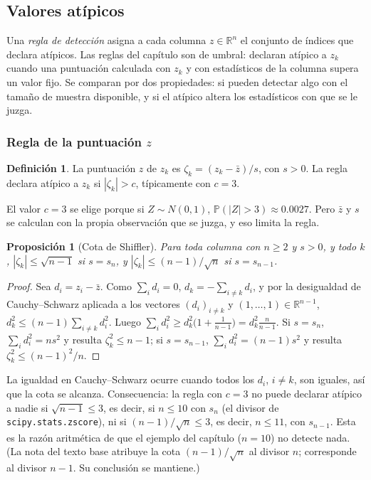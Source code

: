 \documentclass[11pt,a4paper]{article}
\theoremstyle{plain}
\newtheorem{proposicion}[teorema]{Proposición}
\theoremstyle{definition}
\newtheorem{definicion}[teorema]{Definición}
\theoremstyle{remark}
\newcommand{\R}{\mathbb{R}}
\newcommand{\Prob}{\mathbb{P}}
\newcommand{\1}{\mathbf{1}}
\begin{document}
\subsection{Valores atípicos}\label{sec:atipicos}

Una \emph{regla de detección} asigna a cada columna $z\in\R^n$ el
conjunto de índices que declara atípicos. Las reglas del capítulo son de
umbral: declaran atípico a $z_k$ cuando una puntuación calculada con $z_k$
y con estadísticos de la columna supera un valor fijo. Se comparan por dos
propiedades: si pueden detectar algo con el tamaño de muestra disponible, y
si el atípico altera los estadísticos con que se le juzga.

\subsubsection{Regla de la puntuación $z$}

\begin{definicion}
La puntuación $z$ de $z_k$ es $\zeta_k=(z_k-\bar z)/s$, con $s>0$. La regla
declara atípico a $z_k$ si $|\zeta_k|>c$, típicamente con $c=3$.
\end{definicion}

El valor $c=3$ se elige porque si $Z\sim N(0,1)$, $\Prob(|Z|>3)\approx0.0027$.
Pero $\bar z$ y $s$ se calculan con la propia observación que se juzga, y
eso limita la regla.

\begin{proposicion}[Cota de Shiffler]\label{prop:shiffler}
Para toda columna con $n\ge2$ y $s>0$, y todo $k$,
$|\zeta_k|\le\sqrt{n-1}$ si $s=s_n$, y $|\zeta_k|\le(n-1)/\sqrt n$ si
$s=s_{n-1}$.
\end{proposicion}

\begin{proof}
Sea $d_i=z_i-\bar z$. Como $\sum_id_i=0$, $d_k=-\sum_{i\ne k}d_i$, y por
la desigualdad de Cauchy--Schwarz aplicada a los vectores $(d_i)_{i\neq
k}$ y $(1,\dots,1)\in\R^{n-1}$, $d_k^2\le(n-1)\sum_{i\ne k}d_i^2$. Luego
$\sum_id_i^2\ge d_k^2\bigl(1+\frac1{n-1}\bigr)=d_k^2\frac n{n-1}$. Si
$s=s_n$, $\sum_id_i^2=ns^2$ y resulta $\zeta_k^2\le n-1$; si $s=s_{n-1}$,
$\sum_id_i^2=(n-1)s^2$ y resulta $\zeta_k^2\le(n-1)^2/n$.
\end{proof}

La igualdad en Cauchy--Schwarz ocurre cuando todos los $d_i$, $i\ne k$,
son iguales, así que la cota se alcanza. Consecuencia: la regla con $c=3$
no puede declarar atípico a nadie si $\sqrt{n-1}\le3$, es decir, si
$n\le10$ con $s_n$ (el divisor de \texttt{scipy.stats.zscore}), ni si
$(n-1)/\sqrt n\le3$, es decir, $n\le11$, con $s_{n-1}$. Esta es la razón
aritmética de que el ejemplo del capítulo ($n=10$) no detecte nada. (La
nota del texto base atribuye la cota $(n-1)/\sqrt n$ al divisor $n$;
corresponde al divisor $n-1$. Su conclusión se mantiene.)
\end{document}
